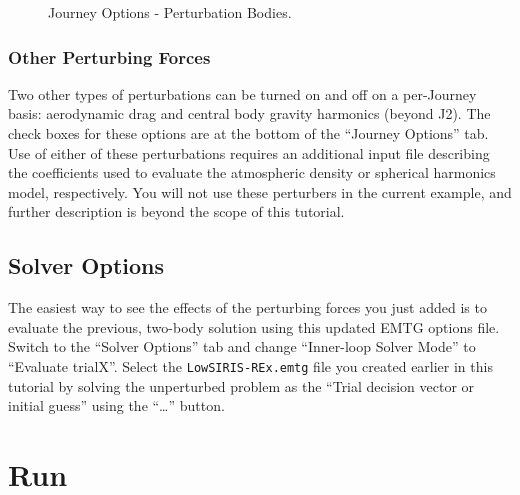 \documentclass[11pt]{article}
\begin{document}
\begin{figure}[H]
	\centering
	\caption{\label{fig:journey_options_perturbation_bodies}Journey Options - Perturbation Bodies.}
\end{figure}

\subsubsection{Other Perturbing Forces}
\label{sec:other_perturbing_forces}

Two other types of perturbations can be turned on and off on a per-Journey basis: aerodynamic drag and central body gravity harmonics (beyond J2). The check boxes for these options are at the bottom of the ``Journey Options'' tab. Use of either of these perturbations requires an additional input file describing the coefficients used to evaluate the atmospheric density or spherical harmonics model, respectively. You will not use these perturbers in the current example, and further description is beyond the scope of this tutorial.

\subsection{Solver Options}
\label{sec:solver_options}

The easiest way to see the effects of the perturbing forces you just added is to evaluate the previous, two-body solution using this updated \ac{EMTG} options file. Switch to the ``Solver Options'' tab and change ``Inner-loop Solver Mode'' to ``Evaluate trialX''. Select the \texttt{LowSIRIS-REx.emtg} file you created earlier in this tutorial by solving the unperturbed problem as the ``Trial decision vector or initial guess'' using the ``…'' button.

\section{Run}
\label{sec:run}
\end{document}
